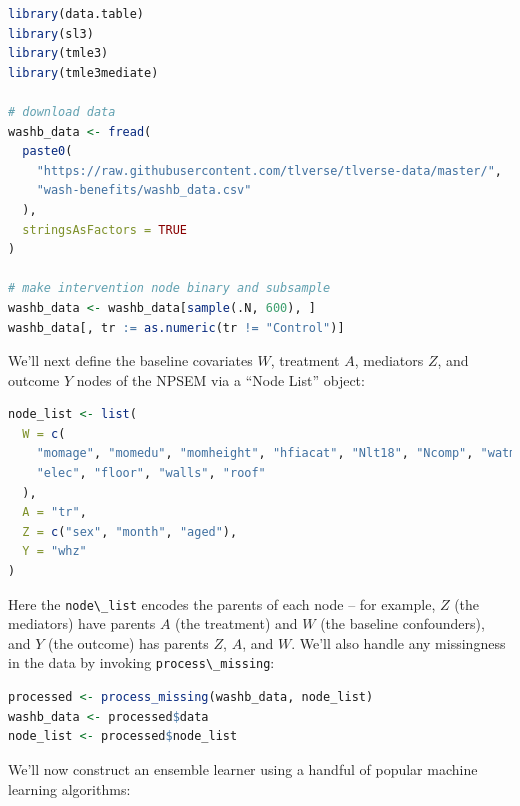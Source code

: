 \documentclass[
  12pt, krantz2,
]{krantz}
\newcommand{\passthrough}[1]{#1}
\theoremstyle{definition}
\theoremstyle{definition}
\theoremstyle{definition}
\newcommand{\1}{\mathbbm{1}}
\begin{document}
\begin{lstlisting}[language=R]
library(data.table)
library(sl3)
library(tmle3)
library(tmle3mediate)

# download data
washb_data <- fread(
  paste0(
    "https://raw.githubusercontent.com/tlverse/tlverse-data/master/",
    "wash-benefits/washb_data.csv"
  ),
  stringsAsFactors = TRUE
)

# make intervention node binary and subsample
washb_data <- washb_data[sample(.N, 600), ]
washb_data[, tr := as.numeric(tr != "Control")]
\end{lstlisting}

We'll next define the baseline covariates \(W\), treatment \(A\), mediators \(Z\),
and outcome \(Y\) nodes of the NPSEM via a ``Node List'' object:

\begin{lstlisting}[language=R]
node_list <- list(
  W = c(
    "momage", "momedu", "momheight", "hfiacat", "Nlt18", "Ncomp", "watmin",
    "elec", "floor", "walls", "roof"
  ),
  A = "tr",
  Z = c("sex", "month", "aged"),
  Y = "whz"
)
\end{lstlisting}

Here the \passthrough{\lstinline!node\_list!} encodes the parents of each node -- for example, \(Z\) (the
mediators) have parents \(A\) (the treatment) and \(W\) (the baseline confounders),
and \(Y\) (the outcome) has parents \(Z\), \(A\), and \(W\). We'll also handle any
missingness in the data by invoking \passthrough{\lstinline!process\_missing!}:

\begin{lstlisting}[language=R]
processed <- process_missing(washb_data, node_list)
washb_data <- processed$data
node_list <- processed$node_list
\end{lstlisting}

We'll now construct an ensemble learner using a handful of popular machine
learning algorithms:
\end{document}
